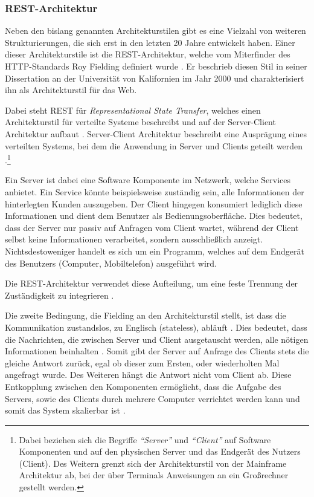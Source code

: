 \subsubsection{REST-Architektur}

Neben den bislang genannten Architekturstilen gibt es eine Vielzahl von weiteren Strukturierungen, die sich erst in den letzten 20 Jahre entwickelt haben. Einer dieser Architekturstile ist die REST-Architektur, welche vom Miterfinder des HTTP-Standards Roy Fielding definiert wurde \parencite[][S. 128]{starke_effektive_2015}. Er beschrieb diesen Stil in seiner Dissertation an der Universität von Kalifornien im Jahr 2000 und charakterisiert ihn als Architekturstil für das Web.

Dabei steht REST für \textit{Representational State Transfer}, welches einen Architekturstil für verteilte Systeme beschreibt und auf der Server-Client Architektur aufbaut \parencite[][S. 76]{fielding_architectural_2000}. Server-Client Architektur beschreibt eine Ausprägung eines verteilten Systems, bei dem die Anwendung in Server und Clients geteilt werden \parencite[][S. 117]{starke_effektive_2015}.\footnote{Dabei beziehen sich die Begriffe \textit{\enquote{Server}} und \textit{\enquote{Client}} auf Software Komponenten und auf den physischen Server und das Endgerät des Nutzers (Client). Des Weitern grenzt sich der  Architekturstil von der Mainframe Architektur ab, bei der über Terminals Anweisungen an ein Großrechner gestellt werden.}

Ein Server ist dabei eine Software Komponente im Netzwerk, welche Services anbietet. Ein Service könnte beispielsweise zuständig sein, alle Informationen der hinterlegten Kunden auszugeben. Der Client hingegen konsumiert lediglich diese Informationen und dient dem Benutzer als Bedienungsoberfläche. Dies bedeutet, dass der Server nur passiv auf Anfragen vom Client wartet, während der Client selbst keine Informationen verarbeitet, sondern ausschließlich anzeigt. Nichtsdestoweniger handelt es sich um ein Programm, welches auf dem Endgerät des Benutzers (Computer, Mobiltelefon) ausgeführt wird.

Die REST-Architektur verwendet diese Aufteilung, um eine feste Trennung der Zuständigkeit zu integrieren \parencite[vgl.][S. 78]{fielding_architectural_2000}.

Die zweite Bedingung, die Fielding an den Architekturstil stellt, ist dass die Kommunikation zustandslos, zu Englisch (stateless), abläuft \parencite[][S. 78]{fielding_architectural_2000}. Dies bedeutet, dass die Nachrichten, die zwischen Server und Client ausgetauscht werden, alle nötigen Informationen beinhalten \parencite[][S. 128]{starke_effektive_2015}. Somit gibt der Server auf Anfrage des Clients stets die gleiche Antwort zurück, egal ob dieser zum Ersten, oder wiederholten Mal angefragt wurde. Des Weiteren hängt die Antwort nicht vom Client ab.
Diese Entkopplung zwischen den Komponenten ermöglicht, dass die Aufgabe des Servers, sowie des Clients durch mehrere Computer verrichtet werden kann und somit das System skalierbar ist \parencite[][S. 79]{fielding_architectural_2000}.

